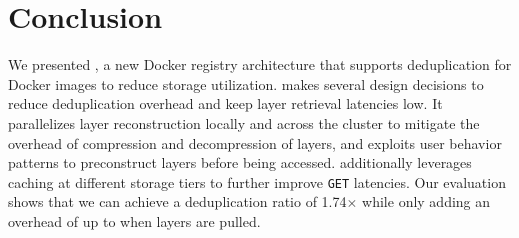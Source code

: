 \section{Conclusion}
\label{sec:conclusion}

We presented \sysname, a new Docker registry architecture that supports deduplication for
Docker images to reduce storage utilization. \sysname makes several design decisions to
reduce deduplication overhead and keep layer retrieval latencies low. It parallelizes
layer reconstruction locally and across the cluster to mitigate the overhead of
compression and decompression of layers, and exploits user behavior patterns to preconstruct
layers before being accessed. \sysname additionally leverages caching at different
storage tiers to further improve \texttt{GET} latencies. Our evaluation shows that
we can achieve a deduplication ratio of 1.74$\times$ while only adding an overhead
of up to \gap when layers are pulled.
